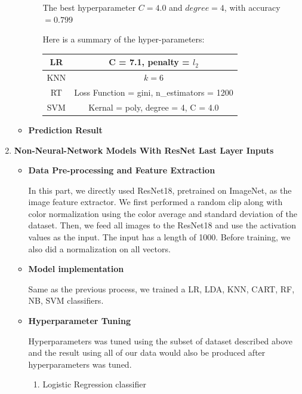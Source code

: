 \documentclass[11.5pt]{article}
\begin{document}
\begin{enumerate}
\begin{itemize}
\begin{enumerate}
                The best hyperparameter $C = 4.0$ and $degree = 4$, with accuracy $= 0.799$

                \begin{figure}

                \end{figure}
                Here is a summary of the hyper-parameters:
            \begin{center}
                \begin{tabular}{|c|c|}
                    \hline
                    LR&C = 7.1, penalty = $l_2$\\ \hline
                    KNN& $k = 6$\\ \hline
                    RT& Loss Function = gini, n\_estimators = 1200\\ \hline
                    SVM& Kernal = poly, degree = 4, C = 4.0\\ \hline
                \end{tabular}
            \end{center}
            \end{enumerate}
            \item \textbf{Prediction Result}
            
        \end{itemize}
        \item \textbf{Non-Neural-Network Models With ResNet Last Layer Inputs}
        \begin{itemize}
            \item \textbf{Data Pre-processing and Feature Extraction}

            In this part, we directly used ResNet18, pretrained on ImageNet, as the image feature extractor. We first performed a random clip along with color normalization using the color average and standard deviation of the dataset. Then, we feed all images to the ResNet18 and use the activation values as the input. The input has a length of 1000. Before training, we also did a normalization on all vectors.
            \item \textbf{Model implementation}

            Same as the previous process, we trained a LR, LDA, KNN, CART, RF, NB, SVM classifiers.
            \item \textbf{Hyperparameter Tuning}
            
            Hyperparameters was tuned using the subset of dataset described above and the result using all of our data would also be produced after hyperparameters was tuned.
            \begin{enumerate}
                \item Logistic Regression classifier


\end{enumerate}
\end{itemize}
\end{enumerate}
\end{document}
